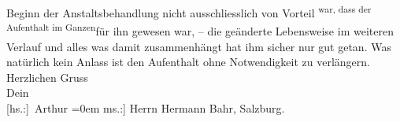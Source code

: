 \begin{ledgroupsized}[t]{13cm}
               Beginn der Anstaltsbehandlung nicht ausschliesslich von Vorteil \substVorne{}\textsuperscript{war, dass der Aufenthalt im Ganzen}{\allowbreak}\substDazwischen{}für ihn gewesen war\substHinten{}, – die geänderte Lebensweise im weiteren Verlauf und alles was damit
               zusammenhängt hat ihm sicher nur gut getan. Was natürlich kein Anlass ist den
               Aufenthalt ohne Notwendigkeit zu verlängern.\pend
           \pstart
           Herzlichen Gruss{\\[\baselineskip]}Dein{\\[\baselineskip]}\spacefill\mbox{{[}hs.:{]} Arthur}\pend
           \leftskip=0em{}\pstart
           \noindent{}{[}ms.:{]} Herrn Hermann Bahr, Salzburg.\pend
           \endnumbering{}\end{ledgroupsized}  \newcommand{\dateiname}{L02129}\newcommand{\titel}{Arthur Schnitzler an Hermann Bahr, 22. 4. 1913}\newcommand{\editorInnen}{ Kurt Ifkovits,  Martin Anton Müller}
      